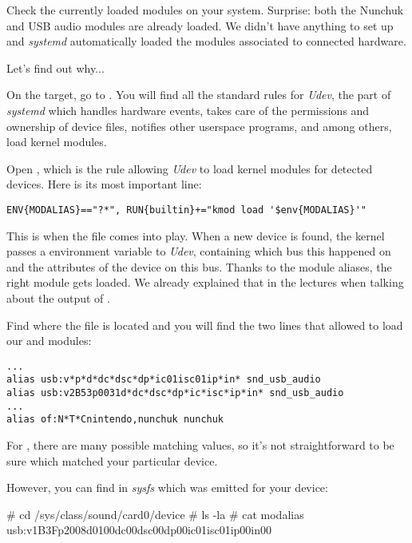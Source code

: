 Check the currently loaded modules on your system. Surprise: both
the Nunchuk and USB audio modules are already loaded.
We didn't have anything to set up and {\em systemd} automatically loaded
the modules associated to connected hardware.

Let's find out why...

On the target, go to . You will find all the
standard rules for {\em Udev}, the part of {\em systemd} which handles
hardware events, takes care of the permissions and ownership of device
files, notifies other userspace programs, and among others, load
kernel modules.

Open , which is the rule allowing {\em Udev}
to load kernel modules for detected devices. Here is its most important
line:

\begin{verbatim}
ENV{MODALIAS}=="?*", RUN{builtin}+="kmod load '$env{MODALIAS}'"
\end{verbatim}

This is when the  file comes into play.
When a new device is found, the kernel passes a 
environment variable to {\em Udev}, containing which bus this
happened on and the attributes of the device on this bus.
Thanks to the module aliases, the right module gets loaded.
We already explained that in the lectures when talking about
the output of .

Find where the  file is located and
you will find the two lines that allowed to load our
 and  modules:

\begin{verbatim}
...
alias usb:v*p*d*dc*dsc*dp*ic01isc01ip*in* snd_usb_audio
alias usb:v2B53p0031d*dc*dsc*dp*ic*isc*ip*in* snd_usb_audio
...
alias of:N*T*Cnintendo,nunchuk nunchuk

\end{verbatim}

For , there are many possible matching values,
so it's not straightforward to be sure which matched your particular
device.

However, you can find in {\em sysfs} which 
was emitted for your device:

\begin{bashinput}
# cd /sys/class/sound/card0/device
# ls -la
# cat modalias
usb:v1B3Fp2008d0100dc00dsc00dp00ic01isc01ip00in00
\end{bashinput}

